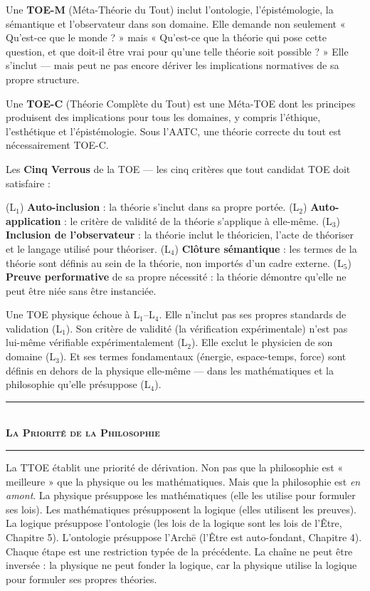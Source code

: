 \documentclass[10pt, openany, oneside]{book}
\renewcommand{\normalsize}{\fontsize{10}{13}\selectfont}
\begin{document}
Une \textbf{TOE-M} (Méta-Théorie du Tout) inclut l'ontologie, l'épistémologie, la sémantique et l'observateur dans son domaine. Elle demande non seulement « Qu'est-ce que le monde ? » mais « Qu'est-ce que la théorie qui pose cette question, et que doit-il être vrai pour qu'une telle théorie soit possible ? » Elle s'inclut --- mais peut ne pas encore dériver les implications normatives de sa propre structure.

Une \textbf{TOE-C} (Théorie Complète du Tout) est une Méta-TOE dont les principes produisent des implications pour tous les domaines, y compris l'éthique, l'esthétique et l'épistémologie. Sous l'AATC, une théorie correcte du tout est nécessairement TOE-C.

Les \textbf{Cinq Verrous} de la TOE --- les cinq critères que tout candidat TOE doit satisfaire :

(L$_1$) \textbf{Auto-inclusion} : la théorie s'inclut dans sa propre portée. (L$_2$) \textbf{Auto-application} : le critère de validité de la théorie s'applique à elle-même. (L$_3$) \textbf{Inclusion de l'observateur} : la théorie inclut le théoricien, l'acte de théoriser et le langage utilisé pour théoriser. (L$_4$) \textbf{Clôture sémantique} : les termes de la théorie sont définis au sein de la théorie, non importés d'un cadre externe. (L$_5$) \textbf{Preuve performative} de sa propre nécessité : la théorie démontre qu'elle ne peut être niée sans être instanciée.

Une TOE physique échoue à L$_1$--L$_4$. Elle n'inclut pas ses propres standards de validation (L$_1$). Son critère de validité (la vérification expérimentale) n'est pas lui-même vérifiable expérimentalement (L$_2$). Elle exclut le physicien de son domaine (L$_3$). Et ses termes fondamentaux (énergie, espace-temps, force) sont définis en dehors de la physique elle-même --- dans les mathématiques et la philosophie qu'elle présuppose (L$_4$).

\vspace{1.5em}

\begin{center}
    \rule{0.3\textwidth}{0.4pt}\\[0.5em]
    {\normalsize\bfseries\scshape La Priorité de la Philosophie}\\[0.3em]
    \rule{0.3\textwidth}{0.4pt}
\end{center}

\vspace{1em}

\noindent La TTOE établit une priorité de dérivation. Non pas que la philosophie est « meilleure » que la physique ou les mathématiques. Mais que la philosophie est \textit{en amont}. La physique présuppose les mathématiques (elle les utilise pour formuler ses lois). Les mathématiques présupposent la logique (elles utilisent les preuves). La logique présuppose l'ontologie (les lois de la logique sont les lois de l'Être, Chapitre 5). L'ontologie présuppose l'Arch\={e} (l'Être est auto-fondant, Chapitre 4). Chaque étape est une restriction typée de la précédente. La chaîne ne peut être inversée : la physique ne peut fonder la logique, car la physique utilise la logique pour formuler ses propres théories.
\end{document}
